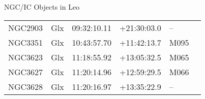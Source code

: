 \begin{block}{NGC/IC Objects in Leo}
  \centering
  \begin{tabularx}{\textwidth}{llrrll} \toprule 
    NGC2903 & Glx & 09:32:10.11 & +21:30:03.0  & -- \\ 
    NGC3351 & Glx & 10:43:57.70 & +11:42:13.7  & M095 \\ 
    NGC3623 & Glx & 11:18:55.92 & +13:05:32.5  & M065 \\ 
    NGC3627 & Glx & 11:20:14.96 & +12:59:29.5  & M066 \\ 
    NGC3628 & Glx & 11:20:16.97 & +13:35:22.9  & -- \\ 
  \end{tabularx}
\end{block}